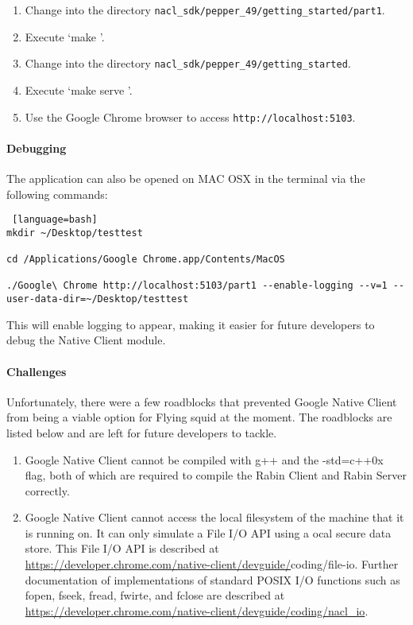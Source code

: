 \begin{appendices}
\begin{enumerate}
\item Change into the directory \verb|nacl_sdk/pepper_49/getting_started/part1|.

\item Execute \lq make \rq .

\item Change into the directory \verb|nacl_sdk/pepper_49/getting_started|.

\item Execute \lq make serve \rq .

\item Use the Google Chrome browser to access \verb|http://localhost:5103|. 

\end{enumerate}

\paragraph{Debugging}

The application can also be opened on MAC OSX in the terminal via the following commands:

\begin{lstlisting} [language=bash]
mkdir ~/Desktop/testtest

cd /Applications/Google Chrome.app/Contents/MacOS

./Google\ Chrome http://localhost:5103/part1 --enable-logging --v=1 --user-data-dir=~/Desktop/testtest
\end{lstlisting}

This will enable logging to appear, making it easier for future developers to debug the Native Client module.


\paragraph{Challenges}

Unfortunately, there were a few roadblocks that prevented Google Native Client from being a viable option for Flying squid at the moment. The roadblocks are listed below and are left for future developers to tackle.

\begin{enumerate}

\item Google Native Client cannot be compiled with g++ and the -std=c++0x flag, both of which are required to compile the Rabin Client and Rabin Server correctly. 

\item Google Native Client cannot access the local filesystem of the machine that it is running on. It can only simulate a File I/O API using a ocal secure data store. This File I/O API is described at  \url{https://developer.chrome.com/native-client/devguide/}coding/file-io. Further documentation of implementations of standard POSIX I/O functions such as fopen, fseek, fread, fwirte, and fclose are described at \url{https://developer.chrome.com/native-client/devguide/coding/nacl_io}.
\end{enumerate}

\end{appendices}